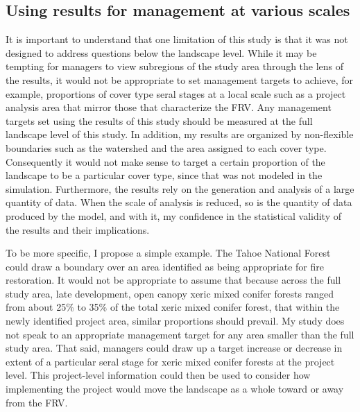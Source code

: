 \subsection{Using results for management at various scales}
It is important to understand that one limitation of this study is that it was not designed to address questions below the landscape level. While it may be tempting for managers to view subregions of the study area through the lens of the results, it would not be appropriate to set management targets to achieve, for example, proportions of cover type seral stages at a local scale such as a project analysis area that mirror those that characterize the FRV. Any management targets set using the results of this study should be measured at the full landscape level of this study. In addition, my results are organized by non-flexible boundaries such as the watershed and the area assigned to each cover type. Consequently it would not make sense to target a certain proportion of the landscape to be a particular cover type, since that was not modeled in the simulation. Furthermore, the results rely on the generation and analysis of a large quantity of data. When the scale of analysis is reduced, so is the quantity of data produced by the model, and with it, my confidence in the statistical validity of the results and their implications. 

To be more specific, I propose a simple example. The Tahoe National Forest could draw a boundary over an area identified as being appropriate for fire restoration. It would not be appropriate to assume that because across the full study area, late development, open canopy xeric mixed conifer forests ranged from about 25\% to 35\% of the total xeric mixed conifer forest, that within the newly identified project area, similar proportions should prevail. My study does not speak to an appropriate management target for any area smaller than the full study area. That said, managers could draw up a target increase or decrease in extent of a particular seral stage for xeric mixed conifer forests at the project level. This project-level information could then be used to consider how implementing the project would move the landscape as a whole toward or away from the FRV. 

